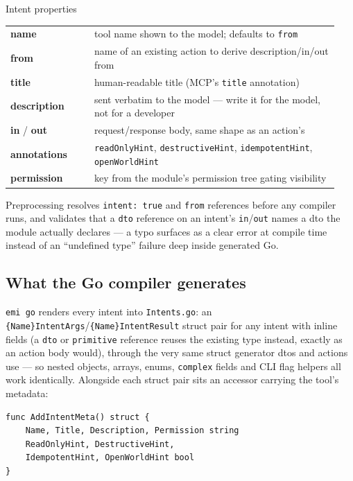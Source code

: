 \begin{sidebar}{Intent properties}
\small
\begin{tabular}{@{}p{0.24\linewidth}p{0.7\linewidth}@{}}
\textbf{name} & tool name shown to the model; defaults to \texttt{from} \\
\textbf{from} & name of an existing action to derive description/in/out from \\
\textbf{title} & human-readable title (MCP's \texttt{title} annotation) \\
\textbf{description} & sent verbatim to the model --- write it for the model, not for a developer \\
\textbf{in} / \textbf{out} & request/response body, same shape as an action's \\
\textbf{annotations} & \texttt{readOnlyHint}, \texttt{destructiveHint}, \texttt{idempotentHint}, \texttt{openWorldHint} \\
\textbf{permission} & key from the module's permission tree gating visibility \\
\end{tabular}
\end{sidebar}

Preprocessing resolves \texttt{intent: true} and \texttt{from}
references before any compiler runs, and validates that a
\texttt{dto} reference on an intent's \texttt{in}/\texttt{out} names a
dto the module actually declares --- a typo surfaces as a clear error
at compile time instead of an ``undefined type'' failure deep inside
generated Go.

\subsection{What the Go compiler generates}
\texttt{emi go} renders every intent into \texttt{Intents.go}: an
\texttt{\{Name\}IntentArgs}/\texttt{\{Name\}IntentResult} struct pair
for any intent with inline fields (a \texttt{dto} or \texttt{primitive}
reference reuses the existing type instead, exactly as an action
body would), through the very same struct generator dtos and actions
use --- so nested objects, arrays, enums, \texttt{complex} fields and
CLI flag helpers all work identically. Alongside each struct pair sits
an accessor carrying the tool's metadata:

\begin{lstlisting}
func AddIntentMeta() struct {
    Name, Title, Description, Permission string
    ReadOnlyHint, DestructiveHint,
    IdempotentHint, OpenWorldHint bool
}
\end{lstlisting}

